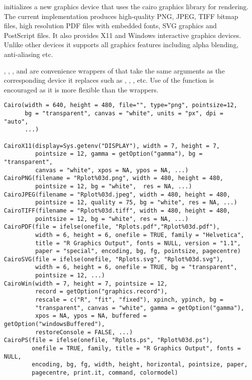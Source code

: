 \begin{Description}\relax
{} initializes a new graphics device that uses the cairo
graphics library for rendering. The current implementation produces
high-quality PNG, JPEG, TIFF bitmap files, high resolution PDF files
with embedded fonts, SVG graphics and PostScript files. It also
provides X11 and Windows interactive graphics devices. Unlike other
devices it supports all graphics features including alpha blending,
anti-aliasing etc.

, , ,  and
 are convenience wrappers of  that take the
same arguments as the corresponding device it replaces such as
, , , etc. Use of the 
function is encouraged as it is more flexible than the wrappers.
\end{Description}
\begin{Usage}
\begin{verbatim}
Cairo(width = 640, height = 480, file="", type="png", pointsize=12, 
      bg = "transparent", canvas = "white", units = "px", dpi = "auto",
      ...)

CairoX11(display=Sys.getenv("DISPLAY"), width = 7, height = 7,
         pointsize = 12, gamma = getOption("gamma"), bg = "transparent",
         canvas = "white", xpos = NA, ypos = NA, ...)
CairoPNG(filename = "Rplot%03d.png", width = 480, height = 480,
         pointsize = 12, bg = "white",  res = NA, ...)
CairoJPEG(filename = "Rplot%03d.jpeg", width = 480, height = 480,
         pointsize = 12, quality = 75, bg = "white", res = NA, ...)
CairoTIFF(filename = "Rplot%03d.tiff", width = 480, height = 480,
         pointsize = 12, bg = "white", res = NA, ...)
CairoPDF(file = ifelse(onefile, "Rplots.pdf","Rplot%03d.pdf"),
         width = 6, height = 6, onefile = TRUE, family = "Helvetica",
         title = "R Graphics Output", fonts = NULL, version = "1.1",
         paper = "special", encoding, bg, fg, pointsize, pagecentre)
CairoSVG(file = ifelse(onefile, "Rplots.svg", "Rplot%03d.svg"),
         width = 6, height = 6, onefile = TRUE, bg = "transparent",
         pointsize = 12, ...)
CairoWin(width = 7, height = 7, pointsize = 12,
         record = getOption("graphics.record"),
         rescale = c("R", "fit", "fixed"), xpinch, ypinch, bg =
         "transparent", canvas = "white", gamma = getOption("gamma"),
         xpos = NA, ypos = NA, buffered = getOption("windowsBuffered"),
         restoreConsole = FALSE, ...)
CairoPS(file = ifelse(onefile, "Rplots.ps", "Rplot%03d.ps"),
        onefile = TRUE, family, title = "R Graphics Output", fonts = NULL,
        encoding, bg, fg, width, height, horizontal, pointsize, paper,
        pagecentre, print.it, command, colormodel)
\end{verbatim}
\end{Usage}
